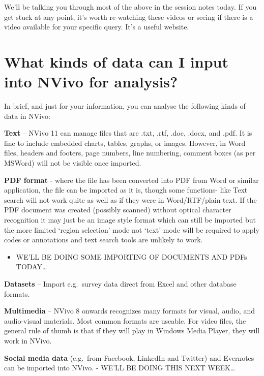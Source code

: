 \documentclass[
]{book}
\providecommand{\tightlist}{%
  \setlength{\itemsep}{0pt}\setlength{\parskip}{0pt}}
\begin{document}
We'll be talking you through most of the above in the session notes today. If you get stuck at any point, it's worth re-watching these videos or seeing if there is a video available for your specific query. It's a useful website.

\hypertarget{what-kinds-of-data-can-i-input-into-nvivo-for-analysis}{%
\section{What kinds of data can I input into NVivo for analysis?}\label{what-kinds-of-data-can-i-input-into-nvivo-for-analysis}}

In brief, and just for your information, you can analyse the following kinds of data in NVivo:

\textbf{Text} -- NVivo 11 can manage files that are .txt, .rtf, .doc, .docx, and .pdf. It is fine to include embedded charts, tables, graphs, or images. However, in Word files, headers and footers, page numbers, line numbering, comment boxes (as per MSWord) will not be visible once imported.

\textbf{PDF format} - where the file has been converted into PDF from Word or similar application, the file can be imported as it is, though some functions- like Text search will not work quite as well as if they were in Word/RTF/plain text. If the PDF document was created (possibly scanned) without optical character recognition it may just be an image style format which can still be imported but the more limited `region selection' mode not `text' mode will be required to apply codes or annotations and text search tools are unlikely to work.

\begin{itemize}
\tightlist
\item
  WE'LL BE DOING SOME IMPORTING OF DOCUMENTS AND PDFs TODAY\ldots{}
\end{itemize}

\textbf{Datasets} -- Import e.g.~survey data direct from Excel and other database formats.

\textbf{Multimedia} -- NVivo 8 onwards recognizes many formats for visual, audio, and audio-visual materials. Most common formats are useable. For video files, the general rule of thumb is that if they will play in Windows Media Player, they will work in NVivo.

\textbf{Social media data} (e.g.~from Facebook, LinkedIn and Twitter) and Evernotes -- can be imported into NVivo. - WE'LL BE DOING THIS NEXT WEEK\ldots{}
\end{document}
